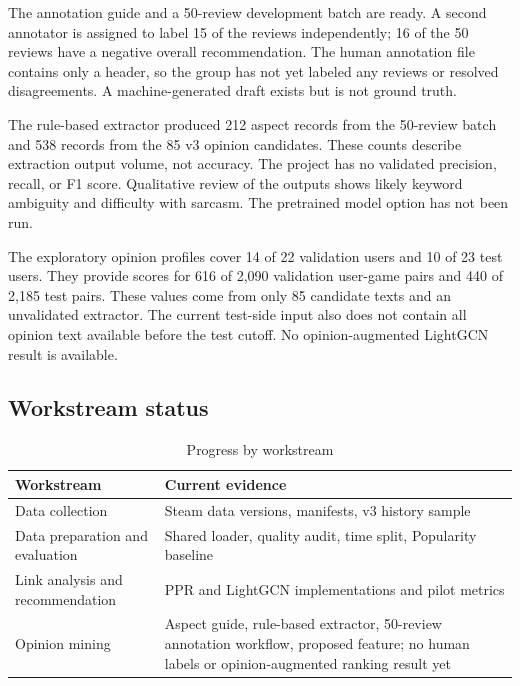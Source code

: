 \documentclass[11pt]{article}
\begin{document}
The annotation guide and a 50-review development batch are ready. A second annotator is assigned to label 15 of the reviews independently; 16 of the 50 reviews have a negative overall recommendation. The human annotation file contains only a header, so the group has not yet labeled any reviews or resolved disagreements. A machine-generated draft exists but is not ground truth.

The rule-based extractor produced 212 aspect records from the 50-review batch and 538 records from the 85 v3 opinion candidates. These counts describe extraction output volume, not accuracy. The project has no validated precision, recall, or F1 score. Qualitative review of the outputs shows likely keyword ambiguity and difficulty with sarcasm. The pretrained model option has not been run.

The exploratory opinion profiles cover 14 of 22 validation users and 10 of 23 test users. They provide scores for 616 of 2,090 validation user-game pairs and 440 of 2,185 test pairs. These values come from only 85 candidate texts and an unvalidated extractor. The current test-side input also does not contain all opinion text available before the test cutoff. No opinion-augmented LightGCN result is available.

\subsection{Workstream status}

\begin{table}[ht]
\centering
\small
\caption{Progress by workstream}
\begin{tabularx}{\linewidth}{l X}
\toprule
Workstream & Current evidence \\
\midrule
Data collection & Steam data versions, manifests, v3 history sample \\
Data preparation and evaluation & Shared loader, quality audit, time split, Popularity baseline \\
Link analysis and recommendation & PPR and LightGCN implementations and pilot metrics \\
Opinion mining & Aspect guide, rule-based extractor, 50-review annotation workflow, proposed feature; no human labels or opinion-augmented ranking result yet \\
\bottomrule
\end{tabularx}
\end{table}

\FloatBarrier
{}
\end{document}
